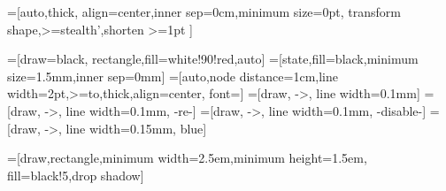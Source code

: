 \usepackage{tikz}
\usetikzlibrary{intersections,patterns,decorations.markings,decorations.pathreplacing,arrows,automata,calc,decorations,fit,positioning,backgrounds}
\usetikzlibrary{positioning}
\usetikzlibrary{fadings}
\usetikzlibrary{arrows,shapes,automata,shadows}
\usetikzlibrary{trees}
\usetikzlibrary{plotmarks}


  
  
=[auto,thick,
  align=center,inner sep=0cm,minimum size=0pt, transform shape,>=stealth',shorten >=1pt
]{}

=[draw=black, rectangle,fill=white!90!red,auto]{}
=[state,fill=black,minimum size=1.5mm,inner sep=0mm]{}
=[auto,node distance=1cm,line width=2pt,>=to,thick,align=center, font=\scriptsize]{}
=[draw, ->, line width=0.1mm]{}
=[draw, ->, line width=0.1mm, -re-]{}
=[draw, ->, line width=0.1mm, -disable-]{}
=[draw, ->, line width=0.15mm, blue]{}

\newcommand{\component}[6]{
  \node[rectangle,draw, fill=white] (#1) #3 [#2] {
  	#5
    \begin{tikzpicture}[component]
      \tikzset{
      place/.style={state,fill=white!89!black,draw=white!50!black,minimum size=0.75cm,inner sep=0.0cm},
    }
      #4
    \end{tikzpicture}
     #6   
  }
}

=[draw,rectangle,minimum width=2.5em,minimum height=1.5em, fill=black!5,drop shadow]


\newcommand{\sendToken}{\ensuremath{STT}}
\newcommand{\rcvToken}{\ensuremath{RTT}}
\newcommand{\sendRequest}{\ensuremath{SR}}
\newcommand{\rcvRequest}{\ensuremath{RR}}
\newcommand{\sendGrant}{\ensuremath{STC}}
\newcommand{\rcvGrant}{\ensuremath{RG}}
\newcommand{\releaseAll}{\ensuremath{rel}}
\newcommand{\sendTokenResource}{\ensuremath{STR}}
\newcommand{\sendTokenToken}{\ensuremath{STT}}
\newcommand{\rcvTokenToken}{\ensuremath{RTT}}
\newcommand{\rcvTokenResource}{\ensuremath{RTR}}
\newcommand{\rcvResource}{\ensuremath{done}}

